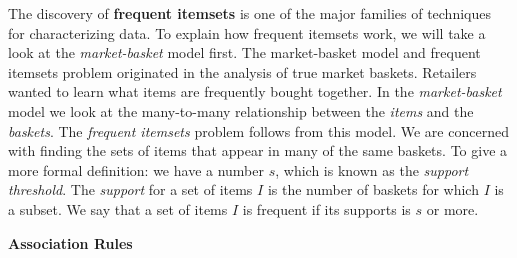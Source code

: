 \documentclass[../essay.tex]{subfiles}
\begin{document}
The discovery of \textbf{frequent itemsets} is one of the major families of
techniques for characterizing data.
To explain how frequent itemsets work, we will take a look at the
\emph{market-basket} model first.
The market-basket model and frequent itemsets problem originated in the analysis
of true market baskets.
Retailers wanted to learn what items are frequently bought together.
In the \emph{market-basket} model we look at the many-to-many relationship
between the \emph{items} and the \emph{baskets}.
The \emph{frequent itemsets} problem follows from this model.
We are concerned with finding the sets of items that appear in many of the same
baskets.
To give a more formal definition: we have a number $s$, which is known as the
\emph{support threshold}.
The \emph{support} for a set of items $I$ is the number of baskets for which $I$
is a subset.
We say that a set of items $I$ is frequent if its supports is $s$ or more.

\textbf{Association Rules}
\end{document}
